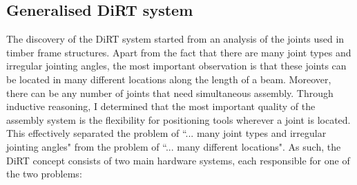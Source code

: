 \documentclass[11pt]{book}
\begin{document}
\subsection{Generalised DiRT system}

The discovery of the DiRT system started from an analysis of the joints used in timber frame structures. Apart from the fact that there are many joint types and irregular jointing angles, the most important observation is that these joints can be located in many different locations along the length of a beam. Moreover, there can be any number of joints that need simultaneous assembly. Through inductive reasoning, I determined that the most important quality of the assembly system is the flexibility for positioning tools wherever a joint is located. This effectively separated the problem of ``... many joint types and irregular jointing angles" from the problem of ``... many different locations". As such, the DiRT concept consists of two main hardware systems, each responsible for one of the two problems:
\end{document}
